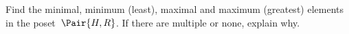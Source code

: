 \documentclass[a4paper,12pt]{article}
\begin{document}
\begin{tasks}
\begin{subtasks}
        \item Find the minimal, minimum (least), maximal and maximum (greatest) elements in the poset~$\Pair{H, R}$.
        If there are multiple or none, explain why.

    \end{subtasks}



\end{tasks}
\end{document}

